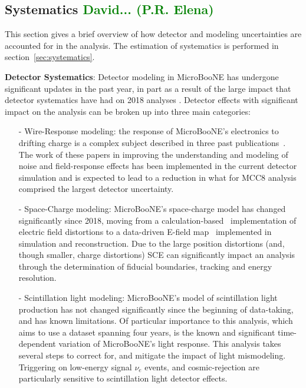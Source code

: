 \subsection{Systematics \textcolor{green}{David... (P.R. Elena)}}
\par This section gives a brief overview of how detector and modeling uncertainties are accounted for in the analysis. The estimation of systematics is performed in section~\ref{sec:systematics}.
\par \noindent \textbf{Detector Systematics}: Detector modeling in MicroBooNE has undergone significant updates in the past year, in part as a result of the large impact that detector systematics have had on 2018 analyses \cite{bib:CCpi0, bib:CCincl}. Detector effects with significant impact on the analysis can be broken up into three main categories:
\begin{itemize}
    \item[-] Wire-Response modeling: the response of MicroBooNE's electronics to drifting charge is a complex subject described in three past publications~\cite{bib:noise,bib:SP1,bib:SP2}. The work of these papers in improving the understanding and modeling of noise and field-response effects has been implemented in the current detector simulation and is expected to lead to a reduction in what for MCC8 analysis comprised the largest detector uncertainty.
    \item[-] Space-Charge modeling: MicroBooNE's space-charge model has changed significantly since 2018, moving from a calculation-based~\cite{bib:SCEsim} implementation of electric field distortions to a data-driven E-field map~\cite{bib:SCEdata} implemented in simulation and reconstruction. Due to the large position distortions (and, though smaller, charge distortions) SCE can significantly impact an analysis through the determination  of fiducial boundaries, tracking and energy resolution.
    \item[-] Scintillation light modeling: MicroBooNE's model of scintillation light production has not changed significantly since the beginning of data-taking, and has known limitations. Of particular importance to this analysis, which aims to use a dataset spanning four years, is the known and significant time-dependent variation of MicroBooNE's light response. This analysis takes several steps to correct for, and mitigate the impact of light mismodeling. Triggering on low-energy signal $\nu_e$ events, and cosmic-rejection are particularly sensitive to scintillation light detector effects.
\end{itemize}
